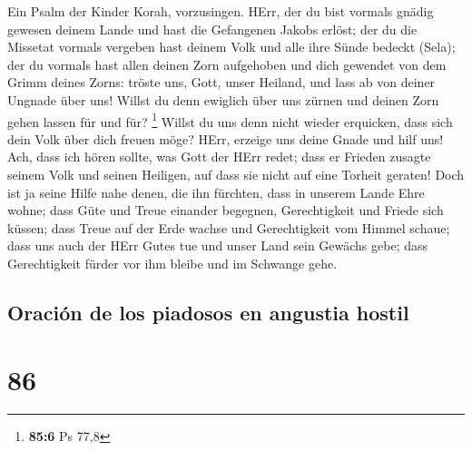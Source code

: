  Ein Psalm der Kinder Korah, vorzusingen. 
HErr, der du bist vormals gnädig gewesen deinem Lande und hast die
Gefangenen Jakobs erlöst;  der du die Missetat vormals
vergeben hast deinem Volk und alle ihre Sünde bedeckt (Sela);
 der du vormals hast allen deinen Zorn aufgehoben und dich
gewendet von dem Grimm deines Zorns:  tröste uns, Gott,
unser Heiland, und lass ab von deiner Ungnade über uns! 
Willst du denn ewiglich über uns zürnen und deinen Zorn gehen lassen für
und für? \footnote{\textbf{85:6} Ps 77,8}  Willst du uns
denn nicht wieder erquicken, dass sich dein Volk über dich freuen möge?
 HErr, erzeige uns deine Gnade und hilf uns!
 Ach, dass ich hören sollte, was Gott der HErr redet; dass
er Frieden zusagte seinem Volk und seinen Heiligen, auf dass sie nicht
auf eine Torheit geraten!  Doch ist ja seine Hilfe nahe
denen, die ihn fürchten, dass in unserem Lande Ehre wohne;
 dass Güte und Treue einander begegnen, Gerechtigkeit und
Friede sich küssen;  dass Treue auf der Erde wachse und
Gerechtigkeit vom Himmel schaue;  dass uns auch der HErr
Gutes tue und unser Land sein Gewächs gebe;  dass
Gerechtigkeit fürder vor ihm bleibe und im Schwange gehe.

\hypertarget{oraciuxf3n-de-los-piadosos-en-angustia-hostil}{%
\subsection{Oración de los piadosos en angustia
hostil}\label{oraciuxf3n-de-los-piadosos-en-angustia-hostil}}

\hypertarget{section-85}{%
\section{86}\label{section-85}}

